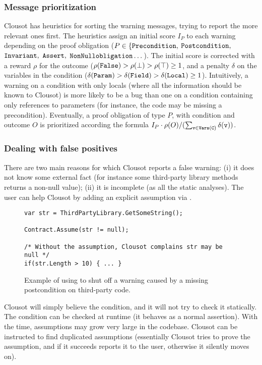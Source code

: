\documentclass{llncs}
\begin{document}
\subsubsection{Message prioritization}
Clousot has heuristics for sorting the warning messages, trying to
report the more relevant ones first.  The heuristics assign an initial
score $I_P$ to each warning depending on the proof obligation ($P \in
\{ \mathtt{Precondition},$ $\mathtt{Postcondition},$ $\mathtt{Invariant},$
$\mathtt{Assert},$ $\mathtt{NonNull obligation} \dots$).  The initial
score is corrected with a reward $\rho$ for the outcome
($\rho(\mathtt{False}) > \rho(\bot) > \rho(\top) \geq 1 $, and a
penalty $\delta$ on the variables in the condition
($\delta(\mathtt{Param}) > \delta(\mathtt{Field}) > \delta(\mathtt{Local})
\geq 1$).  Intuitively, a warning on a condition with only locals
(where all the information should be known to Clousot) is more likely
to be a bug than one on a condition containing only references to
parameters (for instance, the code may be missing a precondition).
Eventually, a proof obligation of type $P$, with condition 
and outcome $O$ is prioritized according the formula $I_P \cdot
\rho(O)/(\sum_{\mathtt{v} \in \mathtt{Vars}(\mathtt{C})} \delta(\mathtt{v}))$.

\subsubsection{Dealing with false positives}
There are two main reasons for which Clousot reports a false warning: (i) it does not know some external fact (for instance some third-party library methods returns a non-null value); (ii) it is incomplete (as all the static analyses).
The user can help Clousot by adding an explicit assumption via .

\begin{figure}[t]
\begin{lstlisting}
var str = ThirdPartyLibrary.GetSomeString();

Contract.Assume(str != null);

/* Without the assumption, Clousot complains str may be null */
if(str.Length > 10) { ... }
\end{lstlisting}
\caption{Example of using  to shut off a warning caused by a missing postcondition on third-party code.}
\label{fig:assume}
\end{figure}

Clousot will simply believe the condition, and it will not try to check it statically.
The condition can  be checked at runtime (it behaves as a normal assertion).
With the time, assumptions may grow very large in the codebase. 
Clousot can be instructed to find  duplicated assumptions (essentially Clousot tries to prove the assumption, and if it succeeds reports it to the user, otherwise it silently moves on).
\end{document}

